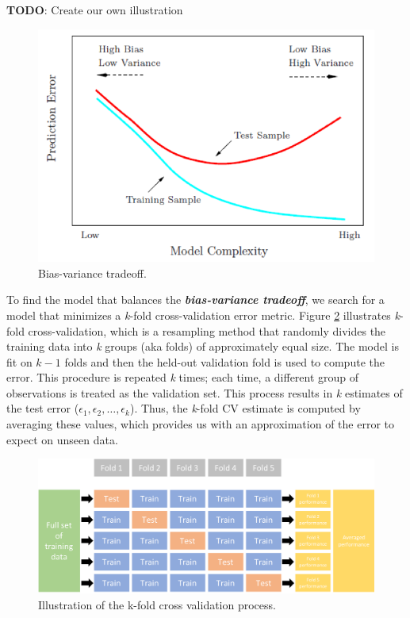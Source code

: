 \documentclass[]{book}
\theoremstyle{definition}
\theoremstyle{definition}
\theoremstyle{definition}
\theoremstyle{remark}
\begin{document}
\textbf{TODO}: Create our own illustration

\begin{figure}

{\centering \includegraphics[width=0.8\linewidth,height=0.8\textheight]{illustrations/bias_var} 

}

\caption{Bias-variance tradeoff.}\label{fig:bias-variance-tradeoff}
\end{figure}

To find the model that balances the \textbf{\emph{bias-variance
tradeoff}}, we search for a model that minimizes a \emph{k}-fold
cross-validation error metric. Figure \ref{fig:06-cv} illustrates
\emph{k}-fold cross-validation, which is a resampling method that
randomly divides the training data into \emph{k} groups (aka folds) of
approximately equal size. The model is fit on \(k-1\) folds and then the
held-out validation fold is used to compute the error. This procedure is
repeated \emph{k} times; each time, a different group of observations is
treated as the validation set. This process results in \emph{k}
estimates of the test error
(\(\epsilon_1, \epsilon_2, \dots, \epsilon_k\)). Thus, the \emph{k}-fold
CV estimate is computed by averaging these values, which provides us
with an approximation of the error to expect on unseen data.

\begin{figure}

{\centering \includegraphics[width=0.7\linewidth]{illustrations/cv} 

}

\caption{Illustration of the k-fold cross validation process.}\label{fig:06-cv}
\end{figure}
\end{document}
